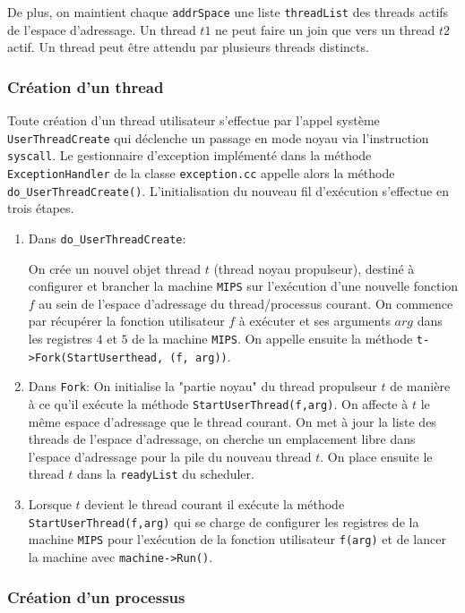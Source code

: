 \documentclass[11pt]{article}
\theoremstyle{definition}
\theoremstyle{definition}
\begin{document}
De plus, on maintient chaque \texttt{addrSpace} une liste \texttt{threadList} des threads actifs de l'espace d'adressage.
Un thread $t1$ ne peut faire un join que vers un thread $t2$ actif.
Un thread peut être attendu par plusieurs threads distincts.

\subsubsection{Création d'un thread}
Toute création d'un thread utilisateur s'effectue par l'appel système
\texttt{UserThreadCreate}
qui déclenche un passage en mode noyau via l'instruction \texttt{syscall}.
Le gestionnaire d'exception implémenté dans la méthode \texttt{ExceptionHandler} de la classe
\texttt{exception.cc} appelle alors la méthode \texttt{do\_UserThreadCreate()}.
L'initialisation du nouveau fil d'exécution s'effectue en trois étapes.

\begin{enumerate}
\item Dans \texttt{do\_UserThreadCreate}:

On crée un nouvel objet thread $t$ (thread noyau propulseur), destiné à configurer et brancher la machine \texttt{MIPS} sur l'exécution d'une nouvelle fonction $f$ au sein de l'espace d'adressage du thread/processus courant.
On commence par récupérer la fonction utilisateur $f$ à exécuter et ses arguments $arg$ dans les registres $4$ et $5$ de la machine \texttt{MIPS}. On appelle ensuite la méthode \texttt{t->Fork(StartUserthead, (f, arg))}.

\item Dans \texttt{Fork}:
On initialise la "partie noyau" du thread propulseur $t$ de manière
à ce qu'il exécute la méthode \texttt{StartUserThread(f,arg)}. On affecte à $t$ le même espace d'adressage que le thread courant. On met à jour la liste des threads de l'espace d'adressage, on cherche un emplacement
libre dans l'espace d'adressage pour la pile du nouveau thread $t$.
On place ensuite le thread $t$ dans la \texttt{readyList} du scheduler.

\item Lorsque $t$ devient le thread courant il exécute la méthode \texttt{StartUserThread(f,arg)}
qui se charge de configurer les registres de la machine \texttt{MIPS} pour l'exécution
de la fonction utilisateur \texttt{f(arg)} et de lancer la machine avec \texttt{machine->Run()}. 
\end{enumerate}

\subsubsection{Création d'un processus}
\end{document}
